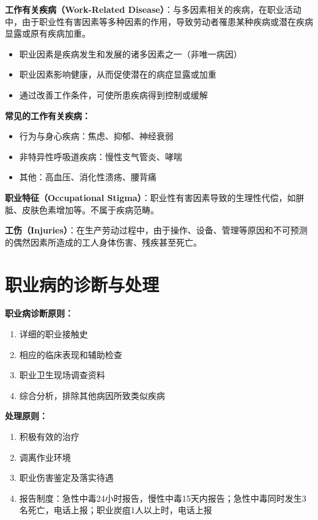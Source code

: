 \begin{defbox}
\textbf{工作有关疾病（Work-Related Disease）}：与多因素相关的疾病，在职业活动中，由于职业性有害因素等多种因素的作用，导致劳动者罹患某种疾病或潜在疾病显露或原有疾病加重。
\begin{itemize}[leftmargin=*]
    \item 职业因素是疾病发生和发展的诸多因素之一（非唯一病因）
    \item 职业因素影响健康，从而促使潜在的病症显露或加重
    \item 通过改善工作条件，可使所患疾病得到控制或缓解
\end{itemize}

\textbf{常见的工作有关疾病：}
\begin{itemize}[leftmargin=*]
    \item 行为与身心疾病：焦虑、抑郁、神经衰弱
    \item 非特异性呼吸道疾病：慢性支气管炎、哮喘
    \item 其他：高血压、消化性溃疡、腰背痛
\end{itemize}
\end{defbox}

\begin{defbox}
\textbf{职业特征（Occupational Stigma）}：职业性有害因素导致的生理性代偿，如胼胝、皮肤色素增加等。不属于疾病范畴。

\textbf{工伤（Injuries）}：在生产劳动过程中，由于操作、设备、管理等原因和不可预测的偶然因素所造成的工人身体伤害、残疾甚至死亡。
\end{defbox}

\section{职业病的诊断与处理}

\begin{keybox}
\textbf{职业病诊断原则：}
\begin{enumerate}[leftmargin=*]
    \item 详细的职业接触史
    \item 相应的临床表现和辅助检查
    \item 职业卫生现场调查资料
    \item 综合分析，排除其他病因所致类似疾病
\end{enumerate}

\textbf{处理原则：}
\begin{enumerate}[leftmargin=*]
    \item 积极有效的治疗
    \item 调离作业环境
    \item 职业伤害鉴定及落实待遇
    \item 报告制度：急性中毒24小时报告，慢性中毒15天内报告；急性中毒同时发生3名死亡，电话上报；职业炭疽1人以上时，电话上报
\end{enumerate}
\end{keybox}


